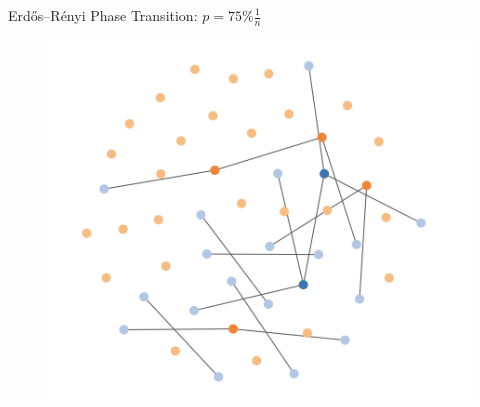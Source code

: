 \documentclass[aspectratio=169, handout]{beamer}
\begin{document}
\begin{frame}{Erdős–Rényi Phase Transition: $p = 75\% \frac{1}{n}$}
\begin{figure}
\includegraphics[scale=0.22]{images/percolation-2-3.png}
\end{figure}
\end{frame}
\end{document}
